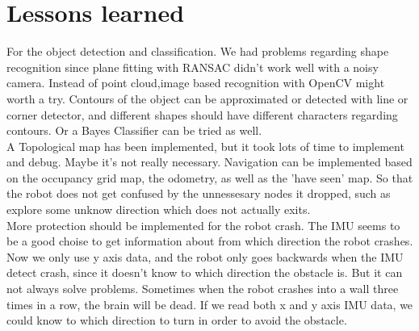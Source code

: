 \section{Lessons learned}

For the object detection and classification.
We had problems regarding shape recognition since plane fitting with RANSAC didn't work well with a noisy camera. 
Instead of point cloud,image based recognition with OpenCV might worth a try. 
Contours of the object can be approximated or detected with line or corner detector, and different shapes should have different characters regarding contours.
Or a Bayes Classifier can be tried as well. \\

\setlength{\parindent}{0pt}A Topological map has been implemented, but it took lots of time to implement and debug.
Maybe it's not really necessary.
Navigation can be implemented based on the occupancy grid map, the odometry, as well as the 'have seen' map. 
So that the robot does not get confused by the unnessesary nodes it dropped, such as explore some unknow direction which does not actually exits.\\

\setlength{\parindent}{0pt}More protection should be implemented for the robot crash.
The IMU seems to be a good choise to get information about from which direction the robot crashes.
Now we only use y axis data, and the robot only goes backwards when the IMU detect crash, since it doesn't know to which direction the obstacle is.
But it can not always solve problems.
Sometimes when the robot crashes into a wall three times in a row, the brain will be dead.
If we read both x and y axis IMU data, we could know to which direction to turn in order to avoid the obstacle.

